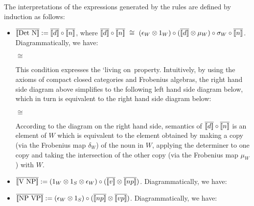 \bigskip
The  interpretations of the expressions  generated by the rules are defined  by induction as follows:




\begin{itemize}
\item  $\overline{[\![ \mbox{Det N} ]\!]} := \overline{[\![ d ]\!]} \circ \overline{[\![ n ]\!]}$, where  $
\overline{\semantics{d}} \circ \overline{\semantics{n}} \ \cong \ (\epsilon_W \otimes 1_W) \circ (\overline{\semantics{d}} \otimes \mu_W) \circ \sigma_W \circ \overline{\semantics{n}}$. Diagrammatically, we have:

\begin{center}
 \qquad $\cong$ \qquad {}  
\end{center}

\noindent
This condition expresses the `living on\ property.  Intuitively,  by using the axioms of compact closed categories and Frobenius algebras,  the right hand side diagram above simplifies to the following left hand side diagram below, which in turn is equivalent to the right hand side diagram below:

\begin{center}
  \qquad $\cong$ \qquad  {} 
 \end{center}
 
 \noindent
 According to the  diagram on the right hand side, semantics of  $\overline{[\![ d ]\!]} \circ \overline{[\![ n ]\!]}$ is an element of $W$ which is equivalent to the element obtained by making a copy (via the Frobenius map $\delta_W$) of the noun  in $W$,  applying the determiner  to one copy and taking the intersection of the other copy (via the Frobenius map $\mu_W$) with $W$. 
 

\item $\overline{[\![ \mbox{V NP} ]\!]} := (1_W \otimes 1_S \otimes \epsilon_W) \circ (\overline{[\![ v ]\!]} \otimes \overline{[\![ np ]\!]})$. Diagrammatically, we have:

\begin{center}
\end{center}

\item $\overline{[\![ \mbox{NP VP} ]\!]} := (\epsilon_W \otimes 1_S) \circ (\overline{[\![ np ]\!]} \otimes \overline{[\![ vp ]\!]})$. Diagrammatically, we have:

\begin{center}
\end{center}
\end{itemize}


